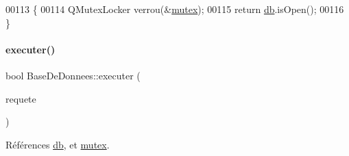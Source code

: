 \begin{DoxyCode}
00113 \{
00114     QMutexLocker verrou(&\hyperlink{class_base_de_donnees_aa1b4696fac87a740f914aa73739086f2}{mutex});
00115     \textcolor{keywordflow}{return} \hyperlink{class_base_de_donnees_a3e738dcf443370c46a541677ab619f06}{db}.isOpen();
00116 \}
\end{DoxyCode}
\mbox{\label{class_base_de_donnees_aa8de5f8f8bb17edc43f5c0ee33712081}} 
\paragraph{\texorpdfstring{executer()}{executer()}}
{\footnotesize\ttfamily bool Base\+De\+Donnees\+::executer (\begin{DoxyParamCaption}\item[{Q\+String}]{requete }\end{DoxyParamCaption})}



Références \hyperlink{class_base_de_donnees_a3e738dcf443370c46a541677ab619f06}{db}, et \hyperlink{class_base_de_donnees_aa1b4696fac87a740f914aa73739086f2}{mutex}.



